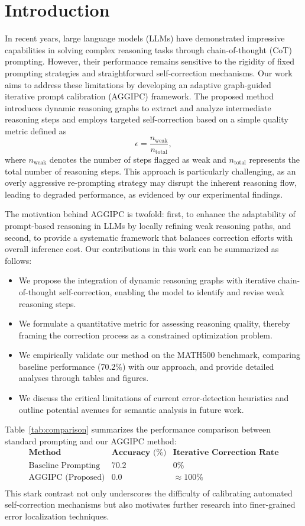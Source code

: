 \documentclass[11pt]{article}
\begin{document}
\section{Introduction}
In recent years, large language models (LLMs) have demonstrated impressive capabilities in solving complex reasoning tasks through chain-of-thought (CoT) prompting. However, their performance remains sensitive to the rigidity of fixed prompting strategies and straightforward self-correction mechanisms. Our work aims to address these limitations by developing an adaptive graph-guided iterative prompt calibration (AGGIPC) framework. The proposed method introduces dynamic reasoning graphs to extract and analyze intermediate reasoning steps and employs targeted self-correction based on a simple quality metric defined as 
\[
\epsilon = \frac{n_{\text{weak}}}{n_{\text{total}}},
\]
where \(n_{\text{weak}}\) denotes the number of steps flagged as weak and \(n_{\text{total}}\) represents the total number of reasoning steps. This approach is particularly challenging, as an overly aggressive re-prompting strategy may disrupt the inherent reasoning flow, leading to degraded performance, as evidenced by our experimental findings.

The motivation behind AGGIPC is twofold: first, to enhance the adaptability of prompt-based reasoning in LLMs by locally refining weak reasoning paths, and second, to provide a systematic framework that balances correction efforts with overall inference cost. Our contributions in this work can be summarized as follows:
\begin{itemize}
    \item We propose the integration of dynamic reasoning graphs with iterative chain-of-thought self-correction, enabling the model to identify and revise weak reasoning steps.
    \item We formulate a quantitative metric for assessing reasoning quality, thereby framing the correction process as a constrained optimization problem.
    \item We empirically validate our method on the MATH500 benchmark, comparing baseline performance (70.2\%) with our approach, and provide detailed analyses through tables and figures.
    \item We discuss the critical limitations of current error-detection heuristics and outline potential avenues for semantic analysis in future work.
\end{itemize}
Table~\ref{tab:comparison} summarizes the performance comparison between standard prompting and our AGGIPC method:
\[
\begin{array}{lcc}
\textbf{Method} & \textbf{Accuracy (\%)} & \textbf{Iterative Correction Rate} \\
\hline
\text{Baseline Prompting} & 70.2 & 0\% \\
\text{AGGIPC (Proposed)} & 0.0 & \approx100\% \\
\end{array}
\]
This stark contrast not only underscores the difficulty of calibrating automated self-correction mechanisms but also motivates further research into finer-grained error localization techniques.
\end{document}
